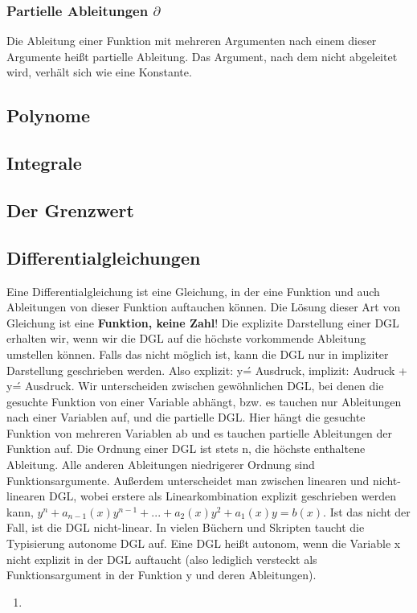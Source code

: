 \documentclass[letterpaper, titlepage]{article}
\begin{document}
\subsubsection{Partielle Ableitungen $\partial$}\label{Partielle Ableitungen}
Die Ableitung einer Funktion mit mehreren Argumenten nach einem dieser Argumente heißt partielle Ableitung. Das Argument, nach dem nicht abgeleitet wird, verhält sich wie eine Konstante.\hfill\break
\\\setlength{\fboxrule}{1pt} %
\subsection{Polynome}\label{Polynome}
\subsection{Integrale}\label{Integrale}
\subsection{Der Grenzwert}\label{Der Grenzwert}
\subsection{Differentialgleichungen}\label{Differentialgleichung}
Eine Differentialgleichung ist eine Gleichung, in der eine Funktion und auch Ableitungen von dieser Funktion auftauchen können. Die Lösung dieser Art von Gleichung ist eine \textbf{Funktion, keine Zahl}! Die explizite Darstellung einer DGL erhalten wir, wenn wir die DGL auf die höchste vorkommende Ableitung umstellen können. Falls das nicht möglich ist, kann die DGL nur in impliziter Darstellung geschrieben werden. Also explizit: y\'= Ausdruck, implizit: Audruck + y\' = Ausdruck. Wir unterscheiden zwischen gewöhnlichen DGL, bei denen die gesuchte Funktion von einer Variable abhängt, bzw. es tauchen nur Ableitungen nach einer Variablen auf, und die partielle DGL. Hier hängt die gesuchte Funktion von mehreren Variablen ab und es tauchen partielle Ableitungen der Funktion auf. Die Ordnung einer DGL ist stets n, die höchste enthaltene Ableitung. Alle anderen Ableitungen niedrigerer Ordnung sind Funktionsargumente. Außerdem unterscheidet man zwischen linearen und nicht-linearen DGL, wobei erstere als Linearkombination explizit geschrieben werden kann, $y^n+a_{n-1}(x)y^{n-1}+...+a_2(x)y^2+a_1(x)y=b(x)$. Ist das nicht der Fall, ist die DGL nicht-linear. In vielen Büchern und Skripten taucht die Typisierung autonome DGL auf. Eine DGL heißt autonom, wenn die Variable x nicht explizit in der DGL auftaucht (also lediglich versteckt als Funktionsargument in der Funktion y und deren Ableitungen).
\begin{enumerate}
    \item 
\end{enumerate}
\end{document}
